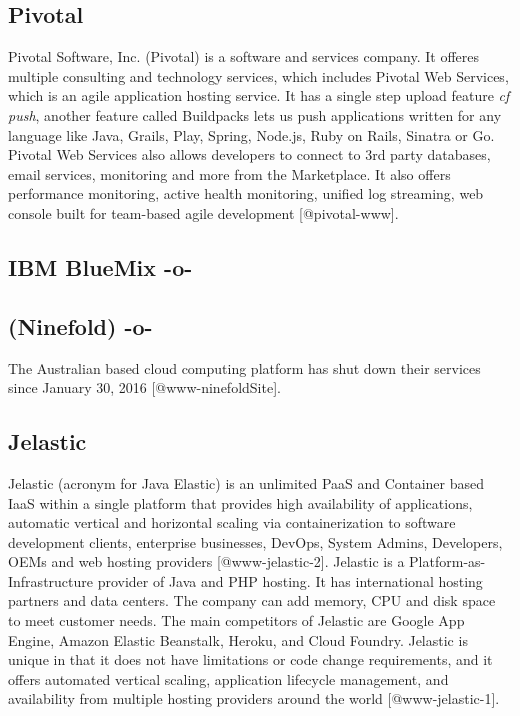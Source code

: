 \subsection{Pivotal}

Pivotal Software, Inc. (Pivotal) is a software and services
company. It offeres multiple consulting and technology services, which
includes Pivotal Web Services, which is an agile application hosting
service. It has a single step upload feature \textit{cf push}, another
feature called Buildpacks lets us push applications written for any
language like Java, Grails, Play, Spring, Node.js, Ruby on Rails,
Sinatra or Go. Pivotal Web Services also allows developers to connect
to 3rd party databases, email services, monitoring and more from the
Marketplace. It also offers performance monitoring, active health
monitoring, unified log streaming, web console built for team-based
agile development [@pivotal-www].

\subsection{IBM BlueMix -o-}



\subsection{ (Ninefold) -o-}

The Australian based cloud computing platform has shut down their
services since January 30, 2016 [@www-ninefoldSite].



\subsection{Jelastic}

Jelastic (acronym for Java Elastic) is an unlimited PaaS and Container
based IaaS within a single platform that provides high availability of
applications, automatic vertical and horizontal scaling via
containerization to software development clients, enterprise
businesses, DevOps, System Admins, Developers, OEMs and web hosting
providers [@www-jelastic-2]. Jelastic is a
Platform-as-Infrastructure provider of Java and PHP hosting.  It has
international hosting partners and data centers. The company can add
memory, CPU and disk space to meet customer needs. The main
competitors of Jelastic are Google App Engine, Amazon Elastic
Beanstalk, Heroku, and Cloud Foundry. Jelastic is unique in that it
does not have limitations or code change requirements, and it offers
automated vertical scaling, application lifecycle management, and
availability from multiple hosting providers around the
world [@www-jelastic-1].

